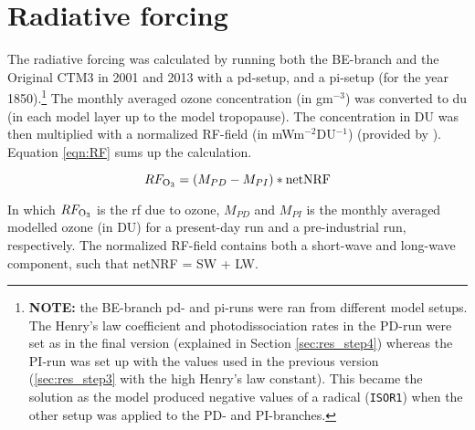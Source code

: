 





\clearpage
\section{Radiative forcing}\label{sec:res_RF}

The radiative forcing was calculated by running both the BE-branch and the Original CTM3 in 2001 and 2013 with a \acrlong{pd}-setup, and a \acrlong{pi}-setup (for the year 1850).\footnote{\textbf{NOTE:} the BE-branch \acrshort{pd}- and \acrshort{pi}-runs were ran from different model setups. The Henry's law coefficient and photodissociation rates in the PD-run were set as in the final version (explained in Section \ref{sec:res_step4}) whereas the PI-run was set up with the values used in the previous version (\ref{sec:res_step3} with the high Henry's law constant). This became the solution as the model produced negative values of a radical (\texttt{ISOR1}) when the other setup was applied to the PD- and PI-branches. } The monthly averaged ozone concentration (in gm$^{-3}$) was converted to \acrlong{du} (in each model layer up to the model tropopause). The concentration in DU was then multiplied with a normalized RF-field (in mWm$^{-2}$DU$^{-1}$) (provided by \cite{MariannePersonal}). Equation \ref{eqn:RF} sums up the calculation.

\begin{equation}
    RF_{\mathrm{O_3}} = (M_{PD} - M_{PI})*\text{netNRF}
    \label{eqn:RF}
\end{equation}

In which $RF_{\mathrm{O_3}}$ is the \acrshort{rf} due to ozone, $M_{PD}$ and $M_{PI}$ is the monthly averaged modelled ozone (in DU) for a present-day run and a pre-industrial run, respectively. The normalized RF-field contains both a short-wave and long-wave component, such that netNRF = SW + LW.

